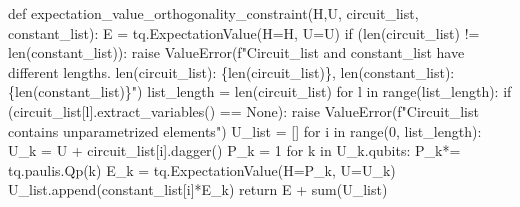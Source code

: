 \documentclass[
  letterpaper,
  DIV=11,
  numbers=noendperiod]{scrartcl}
\newenvironment{Shaded}{\begin{snugshade}}{\end{snugshade}}
\newcommand{\BuiltInTok}[1]{\textcolor[rgb]{0.00,0.23,0.31}{#1}}
\newcommand{\ControlFlowTok}[1]{\textcolor[rgb]{0.00,0.23,0.31}{#1}}
\newcommand{\DecValTok}[1]{\textcolor[rgb]{0.68,0.00,0.00}{#1}}
\newcommand{\KeywordTok}[1]{\textcolor[rgb]{0.00,0.23,0.31}{#1}}
\newcommand{\NormalTok}[1]{\textcolor[rgb]{0.00,0.23,0.31}{#1}}
\newcommand{\OperatorTok}[1]{\textcolor[rgb]{0.37,0.37,0.37}{#1}}
\newcommand{\PreprocessorTok}[1]{\textcolor[rgb]{0.68,0.00,0.00}{#1}}
\newcommand{\SpecialCharTok}[1]{\textcolor[rgb]{0.37,0.37,0.37}{#1}}
\newcommand{\SpecialStringTok}[1]{\textcolor[rgb]{0.13,0.47,0.30}{#1}}
\newcommand{\VariableTok}[1]{\textcolor[rgb]{0.07,0.07,0.07}{#1}}
\newcommand*\circled[1]{\tikz[baseline=(char.base)]{
          \node[shape=circle,draw,inner sep=1pt] (char) {{\scriptsize#1}};}}
\begin{document}
\label{annotated-cell-5}%
\begin{Shaded}
\begin{Highlighting}[]
\KeywordTok{def}\NormalTok{ expectation\_value\_orthogonality\_constraint(H,U, circuit\_list, constant\_list):}
\NormalTok{    E }\OperatorTok{=}\NormalTok{ tq.ExpectationValue(H}\OperatorTok{=}\NormalTok{H, U}\OperatorTok{=}\NormalTok{U)}
    \ControlFlowTok{if}\NormalTok{ (}\BuiltInTok{len}\NormalTok{(circuit\_list) }\OperatorTok{!=} \BuiltInTok{len}\NormalTok{(constant\_list)):}
        \ControlFlowTok{raise} \PreprocessorTok{ValueError}\NormalTok{(}\SpecialStringTok{f"Circuit\_list and constant\_list have different lengths. len(circuit\_list): \textquotesingle{}}\SpecialCharTok{\{}\BuiltInTok{len}\NormalTok{(circuit\_list)}\SpecialCharTok{\}}\SpecialStringTok{\textquotesingle{}, len(constant\_list): \textquotesingle{}}\SpecialCharTok{\{}\BuiltInTok{len}\NormalTok{(constant\_list)}\SpecialCharTok{\}}\SpecialStringTok{\textquotesingle{}"}\NormalTok{)}
\NormalTok{    list\_length }\OperatorTok{=} \BuiltInTok{len}\NormalTok{(circuit\_list)}
    \ControlFlowTok{for}\NormalTok{ l }\KeywordTok{in} \BuiltInTok{range}\NormalTok{(list\_length):}
        \ControlFlowTok{if}\NormalTok{ (circuit\_list[l].extract\_variables() }\OperatorTok{==} \VariableTok{None}\NormalTok{):}
            \ControlFlowTok{raise} \PreprocessorTok{ValueError}\NormalTok{(}\SpecialStringTok{f"Circuit\_list contains unparametrized elements"}\NormalTok{)}
\NormalTok{    U\_list }\OperatorTok{=}\NormalTok{ []}
    \ControlFlowTok{for}\NormalTok{ i }\KeywordTok{in} \BuiltInTok{range}\NormalTok{(}\DecValTok{0}\NormalTok{, list\_length):}
\NormalTok{        U\_k }\OperatorTok{=}\NormalTok{ U }\OperatorTok{+}\NormalTok{ circuit\_list[i].dagger() }\hspace*{\fill}\NormalTok{\circled{1}}
\NormalTok{        P\_k }\OperatorTok{=} \DecValTok{1}
        \ControlFlowTok{for}\NormalTok{ k }\KeywordTok{in}\NormalTok{ U\_k.qubits:}
\NormalTok{            P\_k}\OperatorTok{*=}\NormalTok{ tq.paulis.Qp(k) }\hspace*{\fill}\NormalTok{\circled{2}}
\NormalTok{        E\_k }\OperatorTok{=}\NormalTok{ tq.ExpectationValue(H}\OperatorTok{=}\NormalTok{P\_k, U}\OperatorTok{=}\NormalTok{U\_k)}
\NormalTok{        U\_list.append(constant\_list[i]}\OperatorTok{*}\NormalTok{E\_k)}
    \ControlFlowTok{return}\NormalTok{ E }\OperatorTok{+} \BuiltInTok{sum}\NormalTok{(U\_list)}
\end{Highlighting}
\end{Shaded}
\end{document}
